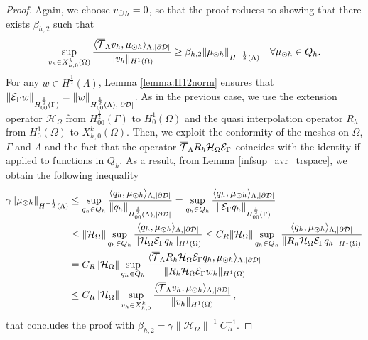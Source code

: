 \documentclass[r]{siamart171218}
\begin{document}
\begin{proof}
 Again, we choose ${v_{\odot}}_h =0$, so that the proof reduces to showing that there exists $\beta_{h,2}$ such that
\begin{equation*}
\sup_{v_h \in X_{h,0}^k(\Omega)} \frac{ \langle {\overline{\mathcal{T}}_\Lambda} v_h , \mu_{\odot h} \rangle _{\Lambda,|\partial\mathcal{D}|} } {\|v_h\|_{H^1(\Omega)} }\geq \beta_{h,2} \|\mu_{\odot h}\|_{H^{-\frac 12}(\Lambda)} 
\quad \forall \mu_{\odot h} \in Q_h.
\end{equation*}
For any $w \in H^{\frac 12}(\Lambda)$, Lemma \ref{lemma:H12norm} ensures that 
$\|\mathcal{E}_\Gamma w\|_{H^{\frac 12}_{00}(\Gamma)} = \|w\|_{H^{\frac 12}_{00}(\Lambda),|\partial\mathcal{D}|}$.
As in the previous case, we use the extension operator $\mathcal{H}_{\Omega}$ from $H^{\frac 12}_{00}(\Gamma)$ to $H^1_0(\Omega)$ and the quasi interpolation operator $R_h$ from $H^1_0(\Omega)$ to $X_{h,0}^k(\Omega)$. Then, we exploit the conformity of the meshes on $\Omega$, $\Gamma$ and $\Lambda$ and the fact that the operator ${\overline{\mathcal{T}}_\Lambda} R_h \mathcal{H}_{\Omega} \mathcal{E}_\Gamma$ coincides with the identity if applied to functions in $Q_h$. As a result, from Lemma \ref{infsup_avr_trspace}, we obtain the following inequality 
\begin{align*}
\gamma \|\mu_{\odot h}\|_{H^{-\frac 12}(\Lambda)} &\leq 
\sup_{q_h \in Q_h} \frac{ \langle q_h, \mu_{\odot h} \rangle_{\Lambda,|\partial\mathcal{D}|} } {\|q_h\|_{H^{\frac 12}_{00}(\Lambda),|\partial\mathcal{D}|}} 
=  \sup_{q_h \in Q_h} \frac{ \langle q_h, \mu_{\odot h} \rangle _{\Lambda,|\partial\mathcal{D}|}} {\|\mathcal{E}_\Gamma q_h\|_{H^{\frac 12}_{00}(\Gamma)}} 
\\
&\leq \|\mathcal{H}_{\Omega}\| \sup_{q_h \in Q_h} \frac{ \langle q_h, \mu_{\odot h} \rangle _{\Lambda,|\partial\mathcal{D}|} } {\|\mathcal{H}_{\Omega} \mathcal{E}_\Gamma q_h\|_{H^1(\Omega)}} 
\leq C_R\|\mathcal{H}_{\Omega}\| \sup_{q_h \in Q_h} \frac{ \langle q_h, \mu_{\odot h} \rangle _{\Lambda,|\partial\mathcal{D}|} } {\|R_h \mathcal{H}_{\Omega} \mathcal{E}_\Gamma q_h\|_{H^1(\Omega)}}
\\
&=  C_R\|\mathcal{H}_{\Omega}\|\sup_{q_h \in Q_h} \frac{ \langle {\overline{\mathcal{T}}_\Lambda} R_h \mathcal{H}_{\Omega} \mathcal{E}_\Gamma q_h, \mu_{\odot h} \rangle _{\Lambda,|\partial\mathcal{D}|}} {\|R_h \mathcal{H}_{\Omega} \mathcal{E}_\Gamma w_h\|_{H^1(\Omega)}} \\
&\leq C_R\|\mathcal{H}_{\Omega}\| \sup_{v_h \in X_{h,0}^k} \frac{ \langle {\overline{\mathcal{T}}_\Lambda} v_h, \mu_{\odot h} \rangle _{\Lambda,|\partial\mathcal{D}|}} {\|v_h\|_{H^1(\Omega)}}\,,
\end{align*}
that concludes the proof with $\beta_{h,2} = \gamma \|\mathcal{H}_{\Omega}\|^{-1} C_R^{-1}$.
\end{proof}

\def\patch{\omega _j}
\end{document}
